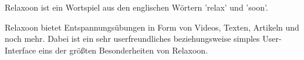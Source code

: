 \begin{spacing}{1}
    
    Relaxoon ist ein Wortspiel aus den englischen Wörtern 'relax' und 'soon'. 

    Relaxoon bietet Entspannungsübungen in Form von Videos, Texten, Artikeln und noch mehr. 
    Dabei ist ein sehr userfreundliches beziehungsweise simples User-Interface eins der größten Besonderheiten von Relaxoon.

\end{spacing}